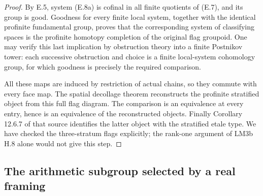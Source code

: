 \begin{proof}
By E.5, system (E.8a) is cofinal in all finite quotients of (E.7),
and its group is good.  Goodness for every finite local system,
together with the identical profinite fundamental group, proves that
the corresponding system of classifying spaces is the profinite
homotopy completion of the original flag groupoid.  One may verify
this last implication by obstruction theory into a finite Postnikov
tower: each successive obstruction and choice is a finite local-system
cohomology group, for which goodness is precisely the required
comparison.

All these maps are induced by restriction of actual chains, so they
commute with every face map.  The spatial decollage theorem
\cite[Theorem 2.7.4; Construction 2.8.8 and (2.8.9)]{ET_BGH2020}
reconstructs the profinite stratified object from this full flag
diagram.  The comparison is an equivalence at every entry, hence is
an equivalence of the reconstructed objects.  Finally Corollary
12.6.7 of that source identifies the latter object with the
stratified etale type.  We have checked the three-stratum flags
explicitly; the rank-one argument of LM3b H.8 alone would not give
this step.
\end{proof}

\subsection{The arithmetic subgroup selected by a real framing}

